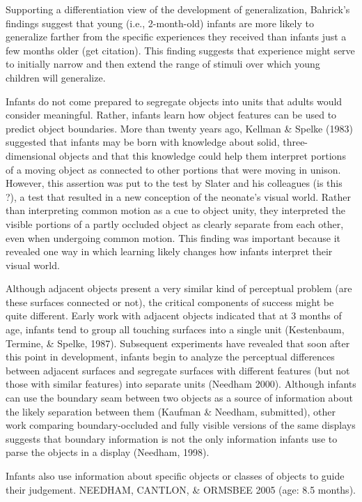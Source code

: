 Supporting a differentiation view of the development of
generalization, Bahrick's findings suggest that young (i.e.,
2-month-old) infants are more likely to generalize farther from the
specific experiences they received than infants just a few months
older (get citation).  This finding suggests that experience might
serve to initially narrow and then extend the range of stimuli over
which young children will generalize.


Infants do not come prepared to segregate objects into units that
adults would consider meaningful.  Rather, infants learn how object
features can be used to predict object boundaries.  More than twenty
years ago, Kellman \& Spelke (1983) suggested that infants may be born
with knowledge about solid, three-dimensional objects and that this
knowledge could help them interpret portions of a moving object as
connected to other portions that were moving in unison.  However, this
assertion was put to the test by Slater and his colleagues (is this
\cite{slater90newborn}?), a test that resulted in a new conception of
the neonate's visual world.  Rather than interpreting common motion as
a cue to object unity, they interpreted the visible portions of a
partly occluded object as clearly separate from each other, even when
undergoing common motion.  This finding was important because it
revealed one way in which learning likely changes how infants
interpret their visual world.


Although adjacent objects present a very similar kind of perceptual
problem (are these surfaces connected or not), the critical components
of success might be quite different.  Early work with adjacent objects
indicated that at 3 months of age, infants tend to group all touching
surfaces into a single unit (Kestenbaum, Termine, \& Spelke, 1987).
Subsequent experiments have revealed that soon after this point in
development, infants begin to analyze the perceptual differences
between adjacent surfaces and segregate surfaces with different
features (but not those with similar features) into separate units
(Needham 2000).  Although infants can use the boundary seam between
two objects as a source of information about the likely separation
between them (Kaufman \& Needham, submitted), other work comparing
boundary-occluded and fully visible versions of the same displays
suggests that boundary information is not the only information infants
use to parse the objects in a display (Needham, 1998).  

Infants also use information about specific objects or
classes of objects to guide their judgement.  
NEEDHAM, CANTLON, \& ORMSBEE 2005 (age: 8.5 months).


